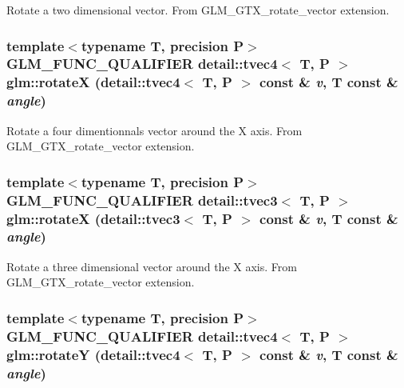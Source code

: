 Rotate a two dimensional vector. From GLM\_\-GTX\_\-rotate\_\-vector extension. \hypertarget{group__gtx__rotate__vector_g846674e399c4106196405900ce78fe27}{
\subsubsection[rotateX]{\setlength{\rightskip}{0pt plus 5cm}template$<$typename T, precision P$>$ GLM\_\-FUNC\_\-QUALIFIER detail::tvec4$<$ T, P $>$ glm::rotateX (detail::tvec4$<$ T, P $>$ const \& {\em v}, \/  T const \& {\em angle})}}
\label{group__gtx__rotate__vector_g846674e399c4106196405900ce78fe27}


Rotate a four dimentionnals vector around the X axis. From GLM\_\-GTX\_\-rotate\_\-vector extension. \hypertarget{group__gtx__rotate__vector_g29ccc284b661dc52c457959f8cbf8af6}{
\subsubsection[rotateX]{\setlength{\rightskip}{0pt plus 5cm}template$<$typename T, precision P$>$ GLM\_\-FUNC\_\-QUALIFIER detail::tvec3$<$ T, P $>$ glm::rotateX (detail::tvec3$<$ T, P $>$ const \& {\em v}, \/  T const \& {\em angle})}}
\label{group__gtx__rotate__vector_g29ccc284b661dc52c457959f8cbf8af6}


Rotate a three dimensional vector around the X axis. From GLM\_\-GTX\_\-rotate\_\-vector extension. \hypertarget{group__gtx__rotate__vector_g8e90d477a21ac9e17a8b764eac6d0999}{
\subsubsection[rotateY]{\setlength{\rightskip}{0pt plus 5cm}template$<$typename T, precision P$>$ GLM\_\-FUNC\_\-QUALIFIER detail::tvec4$<$ T, P $>$ glm::rotateY (detail::tvec4$<$ T, P $>$ const \& {\em v}, \/  T const \& {\em angle})}}
\label{group__gtx__rotate__vector_g8e90d477a21ac9e17a8b764eac6d0999}


